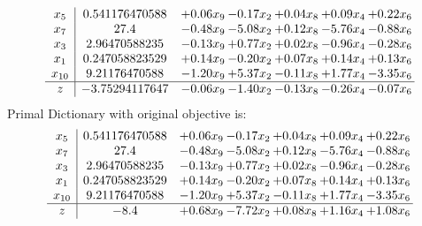 \documentclass[9pt]{article}
\begin{document}
\[\begin{array}{c| c c@{\hskip 2pt} c@{\hskip 2pt} c@{\hskip 2pt} c@{\hskip 2pt} c@{\hskip 2pt} }
 x_{5}   &  0.541176470588 & +  0.06 x_{9} & -0.17 x_{2} & +  0.04 x_{8} & +  0.09 x_{4} & +  0.22 x_{6}\\
 x_{7}   &  27.4 & -0.48 x_{9} & -5.08 x_{2} & +  0.12 x_{8} & -5.76 x_{4} & -0.88 x_{6}\\
 x_{3}   &  2.96470588235 & -0.13 x_{9} & +  0.77 x_{2} & +  0.02 x_{8} & -0.96 x_{4} & -0.28 x_{6}\\
 x_{1}   &  0.247058823529 & +  0.14 x_{9} & -0.20 x_{2} & +  0.07 x_{8} & +  0.14 x_{4} & +  0.13 x_{6}\\
 x_{10}   &  9.21176470588 & -1.20 x_{9} & +  5.37 x_{2} & -0.11 x_{8} & +  1.77 x_{4} & -3.35 x_{6}\\
\hline
z    &  -3.75294117647 & -0.06 x_{9} & -1.40 x_{2} & -0.13 x_{8} & -0.26 x_{4} & -0.07 x_{6}\\
\end{array}\]
Primal Dictionary with original objective is:
\[\begin{array}{c| c c@{\hskip 2pt} c@{\hskip 2pt} c@{\hskip 2pt} c@{\hskip 2pt} c@{\hskip 2pt} }
 x_{5}   &  0.541176470588 & +  0.06 x_{9} & -0.17 x_{2} & +  0.04 x_{8} & +  0.09 x_{4} & +  0.22 x_{6}\\
 x_{7}   &  27.4 & -0.48 x_{9} & -5.08 x_{2} & +  0.12 x_{8} & -5.76 x_{4} & -0.88 x_{6}\\
 x_{3}   &  2.96470588235 & -0.13 x_{9} & +  0.77 x_{2} & +  0.02 x_{8} & -0.96 x_{4} & -0.28 x_{6}\\
 x_{1}   &  0.247058823529 & +  0.14 x_{9} & -0.20 x_{2} & +  0.07 x_{8} & +  0.14 x_{4} & +  0.13 x_{6}\\
 x_{10}   &  9.21176470588 & -1.20 x_{9} & +  5.37 x_{2} & -0.11 x_{8} & +  1.77 x_{4} & -3.35 x_{6}\\
\hline
z    &  -8.4 & +  0.68 x_{9} & -7.72 x_{2} & +  0.08 x_{8} & +  1.16 x_{4} & +  1.08 x_{6}\\
\end{array}\]
\end{document}
